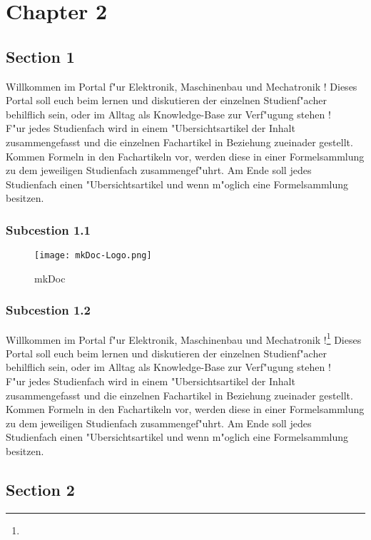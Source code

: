 \chapter{Chapter 2}
\label{cha:Chapter2}

\section{Section 1}
\label{sec:2Section1}
Willkommen im Portal f"ur Elektronik, Maschinenbau und Mechatronik !
Dieses Portal soll euch beim lernen und diskutieren der einzelnen Studienf"acher behilflich sein, oder im Alltag als Knowledge-Base zur Verf"ugung stehen ! \\
F"ur jedes Studienfach wird in einem "Ubersichtsartikel der Inhalt zusammengefasst und die einzelnen Fachartikel in Beziehung zueinader gestellt. Kommen Formeln in den Fachartikeln vor, werden diese in einer Formelsammlung zu dem jeweiligen Studienfach zusammengef"uhrt. Am Ende soll jedes Studienfach einen "Ubersichtsartikel und wenn m"oglich eine Formelsammlung besitzen.

\subsection{Subcestion 1.1}
\label{subsec:2Subcestion1.1}

\begin{figure}[htb]
\centering
\texttt{[image: mkDoc-Logo.png]}
\caption{mkDoc}
\label{fig:mkDoc}
\end{figure}


\subsection{Subcestion 1.2}
\label{subsec:2Subcestion 1.2}
Willkommen im Portal f"ur Elektronik, Maschinenbau und Mechatronik !\footnote{\Vgl{}}
Dieses Portal soll euch beim lernen und diskutieren der einzelnen Studienf"acher behilflich sein, oder im Alltag als Knowledge-Base zur Verf"ugung stehen ! \\
F"ur jedes Studienfach wird in einem "Ubersichtsartikel der Inhalt zusammengefasst und die einzelnen Fachartikel in Beziehung zueinader gestellt. Kommen Formeln in den Fachartikeln vor, werden diese in einer Formelsammlung zu dem jeweiligen Studienfach zusammengef"uhrt. Am Ende soll jedes Studienfach einen "Ubersichtsartikel und wenn m"oglich eine Formelsammlung besitzen.

\section{Section 2}
\label{sec:2Section2}

